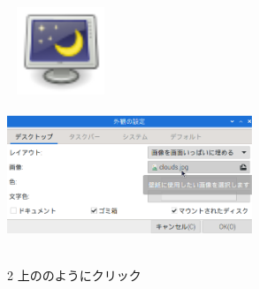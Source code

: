 \documentclass[a4paper,12pt]{jarticle}
\begin{document}
\begin{figure}
\begin{minipage}{\textwidth}
\begin{minipage}{7.737cm}
      \hfill
      \includegraphics[width=3.193cm,height=2.631cm]{textbook-img106.png}\\
      \includegraphics[width=7.324cm,height=4.539cm]{textbook-img108.png}\\
      \begin{minipage}{8.035cm}
        2 上ののようにクリック
      \end{minipage}
    \end{minipage}

  \end{minipage}

  \begin{minipage}{\textwidth}


\end{minipage}
\end{figure}
\end{document}
